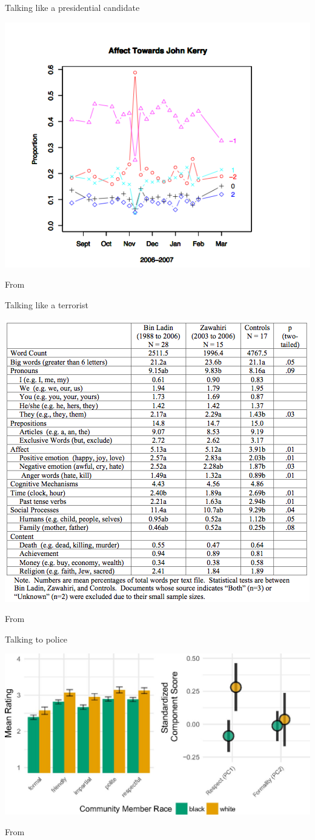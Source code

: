 \documentclass{hertieteaching}
\begin{document}
\begin{frame}{Talking like a presidential candidate}

\centerline{\includegraphics[width=0.55\linewidth]{pictures/kerry-blogs}} 

\centerline{From \textcite{Hopkin.King2010}}

\end{frame}

\begin{frame}{Talking like a terrorist}

\centerline{\includegraphics[width=0.6\linewidth]{pictures/binladen}} 

\centerline{From \textcite{Pennebaker.Chung2008}}

\end{frame}

\begin{frame}{Talking to police}


\centerline{\includegraphics[width=0.7\linewidth]{pictures/respect.jpg}} 

\medskip
\centerline{From \textcite{Voigt.etal2017}}

\end{frame}
\end{document}
